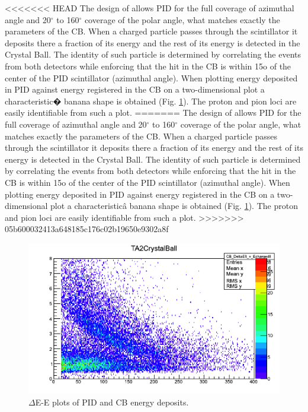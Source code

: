 <<<<<<< HEAD
\indent The design of allows PID for the full coverage of azimuthal angle and 20$^{\circ}$ to 160$^{\circ}$ coverage of the polar angle, what matches exactly the parameters of the CB. When  a  charged  particle  passes  through  the  scintillator  it  deposits  there  a fraction of its energy and the rest of its energy is detected in the Crystal Ball. The identity  of  such  particle  is  determined  by  correlating  the  events  from  both detectors while enforcing that the hit in the CB is within 15o of the center of the PID scintillator (azimuthal angle). When plotting energy deposited in PID against energy registered in the CB on a two-dimensional plot a characteristic� banana shape is obtained (Fig. \ref{banana}). The proton and pion loci are easily identifiable from such a plot.
=======
\indent The design of allows PID for the full coverage of azimuthal angle and 20$^{\circ}$ to 160$^{\circ}$ coverage of the polar angle, what matches exactly the parameters of the CB. When  a  charged  particle  passes  through  the  scintillator  it  deposits  there  a fraction of its energy and the rest of its energy is detected in the Crystal Ball. The identity  of  such  particle  is  determined  by  correlating  the  events  from  both detectors while enforcing that the hit in the CB is within 15o of the center of the PID scintillator (azimuthal angle). When plotting energy deposited in PID against energy registered in the CB on a two-dimensional plot a characteristicâ banana shape is obtained (Fig. \ref{banana}). The proton and pion loci are easily identifiable from such a plot.
>>>>>>> 05b600032413a648185c176c02b19650e9302a8f

\begin{figure}[H]
\begin{center}
\includegraphics[scale=0.8]{pictures/png/banana.png}
\caption{$\Delta$E-E plots of PID and CB energy deposits.}
\label{banana}
\end{center}
\end{figure}

